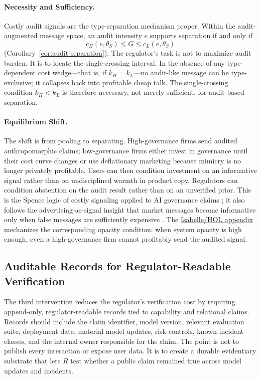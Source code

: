 \documentclass[preprint,authoryear]{elsarticle}
\theoremstyle{definition}
\theoremstyle{plain}
\begin{document}
\paragraph{Necessity and Sufficiency.}
Costly audit signals are the type-separation mechanism proper.  Within the
audit-augmented message space, an audit intensity $e$ supports separation if
and only if
\[
c_H(e,\theta_S)\le G \le c_L(e,\theta_S)
\]
(Corollary~\ref{cor:audit-separation}).  The regulator's task is not to
maximize audit burden.  It is to locate the single-crossing interval.
In the absence of any type-dependent cost wedge---that is, if $k_H=k_L$---no
audit-like message can be type-exclusive; it collapses back into profitable
cheap talk.  The single-crossing condition $k_H<k_L$ is therefore necessary,
not merely sufficient, for audit-based separation.

\paragraph{Equilibrium Shift.}
The shift is from pooling to separating. High-governance firms send audited
anthropomorphic claims; low-governance firms either invest in governance until
their cost curve changes or use deflationary marketing because mimicry is no longer privately profitable. Users can then condition
investment on an informative signal rather than on undisciplined warmth in
product copy. Regulators can condition abstention on the audit result rather
than on an unverified prior. This is the Spence logic of costly signaling
applied to AI governance claims \citep{spence1973}; it also follows the
advertising-as-signal insight that market messages become informative only when
false messages are sufficiently expensive \citep{milgrom_roberts1986}. The \hyperref[app:isabelle]{Isabelle/HOL appendix} mechanizes the corresponding opacity condition: when system opacity is high enough, even a high-governance firm cannot profitably send the audited signal.

\subsection{Auditable Records for Regulator-Readable Verification}
\label{subsec:auditable-records}

The third intervention reduces the regulator's verification cost by requiring
append-only, regulator-readable records tied to capability and relational
claims. Records should include the claim identifier, model version, relevant
evaluation suite, deployment date, material model updates, risk controls,
known incident classes, and the internal owner responsible for the claim. The
point is not to publish every interaction or expose user data. It is to create a
durable evidentiary substrate that lets $R$ test whether a public claim remained
true across model updates and incidents.
\end{document}
